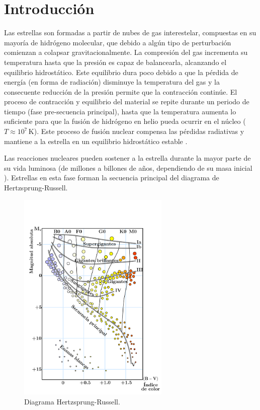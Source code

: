 \chapter{Introducción}

Las estrellas son formadas a partir de nubes de gas interestelar, compuestas en su mayoría de hidrógeno molecular, que debido a algún tipo de perturbación comienzan a colapsar gravitacionalmente. La compresión del gas incrementa su temperatura hasta que la presión es capaz de balancearla, alcanzando el equilibrio hidrostático. Este equilibrio dura poco debido a que la pérdida de energía (en forma de radiación) disminuye la temperatura del gas y la consecuente reducción de la presión permite que la contracción continúe. El proceso de contracción y equilibrio del material se repite durante un periodo de tiempo (fase pre-secuencia principal), hasta que la temperatura aumenta lo suficiente para que la fusión de hidrógeno en helio pueda ocurrir en el núcleo ($T\approx 10^7\,\si{\kelvin}$). Este proceso de fusión nuclear compensa las pérdidas radiativas y mantiene a la estrella en un equilibrio hidrostático estable \cite{Scilla2016}.

Las reacciones nucleares pueden sostener a la estrella durante la mayor parte de su vida luminosa (de millones a billones de años, dependiendo de su masa inicial \cite{Salaris2005EvolutionPopulations}). Estrellas en esta fase forman la secuencia principal del diagrama de Hertzsprung-Russell.
\setcounter{footnote}{0}
\begin{figure}[H]
    \centering
    \includegraphics[width=205pt]{figures/H-R_diagram.pdf}%
    \caption[Diagrama Hertzsprung-Russell]{Diagrama Hertzsprung-Russell.\protect\footnotemark}
    \label{HR}
\end{figure}

